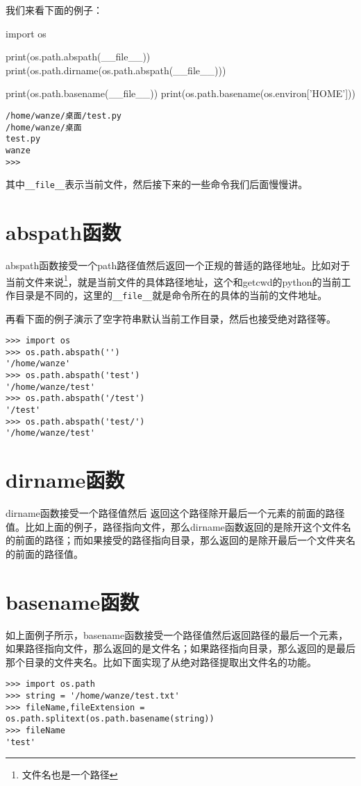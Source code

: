 \documentclass[12pt,oneside]{book}
\begin{document}
\begin{common-format}
我们来看下面的例子：
\begin{tcbpython}[]
import os

print(os.path.abspath(__file__))
print(os.path.dirname(os.path.abspath(__file__)))

print(os.path.basename(__file__))
print(os.path.basename(os.environ['HOME']))

\end{tcbpython}
\begin{Verbatim}
/home/wanze/桌面/test.py
/home/wanze/桌面
test.py
wanze
>>> 
\end{Verbatim}

其中\verb+__file__+表示当前文件，然后接下来的一些命令我们后面慢慢讲。

\section{abspath函数}
abspath函数接受一个path路径值然后返回一个正规的普适的路径地址。比如对于当前文件来说\footnote{文件名也是一个路径}，就是当前文件的具体路径地址，这个和getcwd的python的当前工作目录是不同的，这里的\verb+__file__+就是命令所在的具体的当前的文件地址。

再看下面的例子演示了空字符串默认当前工作目录，然后也接受绝对路径等。
\begin{Verbatim}
>>> import os
>>> os.path.abspath('')
'/home/wanze'
>>> os.path.abspath('test')
'/home/wanze/test'
>>> os.path.abspath('/test')
'/test'
>>> os.path.abspath('test/')
'/home/wanze/test'
\end{Verbatim}

\section{dirname函数}
dirname函数接受一个路径值然后 返回这个路径除开最后一个元素的前面的路径值。比如上面的例子，路径指向文件，那么dirname函数返回的是除开这个文件名的前面的路径；而如果接受的路径指向目录，那么返回的是除开最后一个文件夹名的前面的路径值。

\section{basename函数}
如上面例子所示，basename函数接受一个路径值然后返回路径的最后一个元素，如果路径指向文件，那么返回的是文件名；如果路径指向目录，那么返回的是最后那个目录的文件夹名。比如下面实现了从绝对路径提取出文件名的功能。
\begin{Verbatim}
>>> import os.path
>>> string = '/home/wanze/test.txt'
>>> fileName,fileExtension = os.path.splitext(os.path.basename(string))
>>> fileName
'test'
\end{Verbatim}



\end{common-format}
\end{document}
